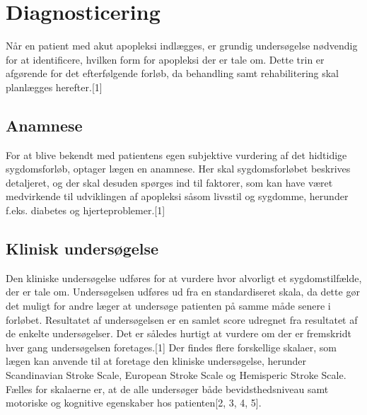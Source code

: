 \section{Diagnosticering}

Når en patient med akut apopleksi indlægges, er grundig undersøgelse nødvendig for at identificere, hvilken form for apopleksi der er tale om. Dette trin er afgørende for det efterfølgende forløb, da behandling samt rehabilitering skal planlægges herefter.[1]

\subsection{Anamnese}
For at blive bekendt med patientens egen subjektive vurdering af det hidtidige sygdomsforløb, optager lægen en anamnese. Her skal sygdomsforløbet  beskrives detaljeret, og der skal desuden spørges ind til faktorer, som kan have været medvirkende til udviklingen af apopleksi såsom livsstil og sygdomme, herunder f.eks. diabetes og hjerteproblemer.[1]

\subsection{Klinisk undersøgelse}
Den kliniske undersøgelse udføres for at vurdere hvor alvorligt et sygdomstilfælde, der er tale om. Undersøgelsen udføres ud fra en standardiseret skala, da dette gør det muligt for andre læger at undersøge patienten på samme måde senere i forløbet. Resultatet af undersøgelsen er en samlet score udregnet fra resultatet af de enkelte undersøgelser. Det er således hurtigt %
at vurdere om der er fremskridt hver gang undersøgelsen foretages.[1] 
Der findes flere forskellige skalaer, som lægen kan anvende til at foretage den kliniske undersøgelse, herunder Scandinavian Stroke Scale, European Stroke Scale og Hemisperic Stroke Scale. Fælles for skalaerne er, at de alle undersøger både bevidsthedsniveau samt motoriske og kognitive egenskaber hos patienten[2, 3, 4, 5]. %


